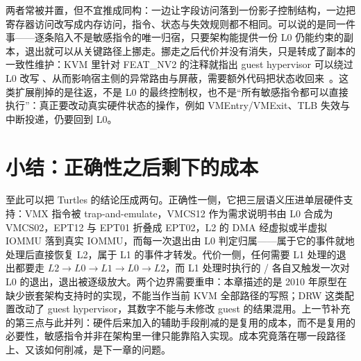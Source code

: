 两者常被并置，但不宜推成同构：一边让字段访问落到一份影子控制结构，一边把寄存器访问改写成内存访问，指令、状态与失效规则都不相同。可以说的是同一件事——逐条陷入不是敏感指令的唯一归宿，只要架构能提供一份 L0 仍能约束的副本，退出就可以从关键路径上挪走。挪走之后代价并没有消失，只是转成了副本的一致性维护：KVM 里针对 FEAT\_NV2 的注释就指出 guest hypervisor 可以绕过 L0 改写 、从而影响宿主侧的异常路由与屏蔽，需要额外代码把状态收回来~\cite{source5}。这类扩展削掉的是往返，不是 L0 的最终控制权，也不是“所有敏感指令都可以直接执行”：真正要改动真实硬件状态的操作，例如 VMEntry/VMExit、TLB 失效与中断投递，仍要回到 L0。

\section{小结：正确性之后剩下的成本}\label{sec:turtles-summary}

至此可以把 Turtles 的结论压成两句。正确性一侧，它把三层语义压进单层硬件支持：VMX 指令被 trap-and-emulate，VMCS12 作为需求说明书由 L0 合成为 VMCS02，EPT12 与 EPT01 折叠成 EPT02，L2 的 DMA 经虚拟或半虚拟 IOMMU 落到真实 IOMMU，而每一次退出由 L0 判定归属——属于它的事件就地处理后直接恢复 L2，属于 L1 的事件才转发。代价一侧，任何需要 L1 处理的退出都要走 $L2 \to L0 \to L1 \to L0 \to L2$，而 L1 处理时执行的 / 各自又触发一次对 L0 的退出，退出被逐级放大。两个边界需要重申：本章描述的是 2010 年原型在缺少嵌套架构支持时的实现，不能当作当前 KVM 全部路径的写照；DRW 这类配置改动了 guest hypervisor，其数字不能与未修改 guest 的结果混用。上一节补充的第三点与此并列：硬件后来加入的辅助手段削减的是复用的成本，而不是复用的必要性，敏感指令并非在架构里一律只能靠陷入实现。成本究竟落在哪一段路径上、又该如何削减，是下一章的问题。
